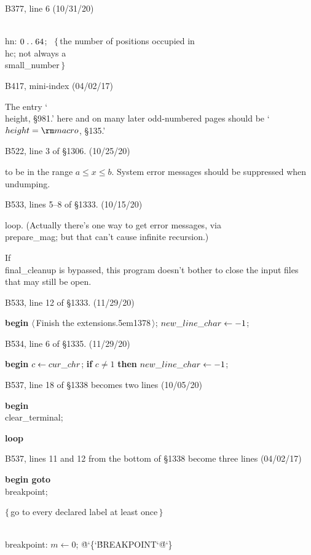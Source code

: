 \bugonpage B377, line 6 (10/31/20)

\ninepoint\noindent
\\{hn}: $0\mathrel{.\,.}64$; \ $\{\,$the number of positions occupied in \\{hc};
                       not always a \\{small\_number}$\,\}$

\bugonpage B417, mini-index (04/02/17)

\eightpoint\noindent
The entry `\\{height}, \S981.' here and on many later
odd-numbered pages should be `$\\{height}=\rm macro$, \S135.'

\bugonpage B522, line 3 of \S1306. (10/25/20)

\tenpoint\noindent
to be in the range $a\le x\le b$.
System error messages should be suppressed when undumping.

\bugonpage B533, lines 5--8 of \S1333. (10/15/20)

\tenpoint\noindent
loop.
(Actually there's one way to get error messages, via \\{prepare\_mag};
but that can't cause infinite recursion.)\par
\noindent\quad
If \\{final\_cleanup} is bypassed, this program doesn't bother to
close the input files that may still be open.

\bugonpage B533, line 12 of \S1333. (11/29/20)

\ninepoint\noindent\quad
{\bf begin} $\langle\,$Finish the extensions{\sevenrm\kern.5em1378}$\,\rangle$;
$\\{new\_line\_char}\gets-1$;

\bugonpage B534, line 6 of \S1335. (11/29/20)

\ninepoint\noindent\quad
{\bf begin} $c\gets\\{cur\_chr}$;
{\bf if} $c\ne1$ {\bf then} $\\{new\_line\_char}\gets-1$;

\bugonpage B537, line 18 of \S1338 becomes two lines (10/05/20)

\ninepoint\noindent\quad
{\bf begin} \\{clear\_terminal};\par
\noindent\quad
{\bf loop}

\bugonpage B537, lines 11 and 12 from the bottom of \S1338
  become three lines (04/02/17)

\ninepoint\noindent\qquad\qquad
{\bf begin goto} \\{breakpoint};\par
\noindent\qquad\qquad\quad$\{\,$go to every declared label at least once$\,\}$\par
\noindent\qquad\quad\\{breakpoint}: $m\gets0$;
 \.{@\char`\{\char`\'BREAKPOINT\char`\'@\char`\}}


